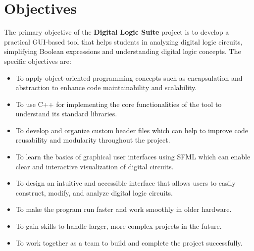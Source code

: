 \section{Objectives}

The primary objective of the \textbf{Digital Logic Suite} project is to develop a practical GUI-based tool that helps students in analyzing digital logic circuits, simplifying Boolean expressions and understanding digital logic concepts. The specific objectives are:

\begin{itemize}
      \item To apply object-oriented programming concepts such as encapsulation and abstraction to enhance code maintainability and scalability.

      \item To use C++ for implementing the core functionalities of the tool to understand its standard libraries.

      \item To develop and organize custom header files which can help to improve code reusability and modularity throughout the project.

      \item To learn the basics of graphical user interfaces using SFML which can enable clear and interactive visualization of digital circuits.

      \item To design an intuitive and accessible interface that allows users to easily construct, modify, and analyze digital logic circuits.

      \item To make the program run faster and work smoothly in older hardware.

      \item To gain skills to handle larger, more complex projects in the future.

      \item To work together as a team to build and complete the project successfully.

\end{itemize}
\clearpage